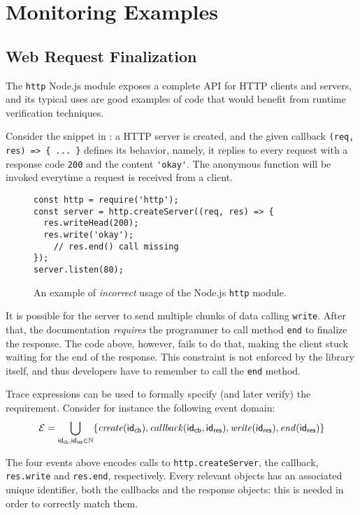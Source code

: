 \section{Monitoring Examples}
\label{sec:examples}
\subsection{Web Request Finalization}
The \lstinline{http} Node.js module exposes a complete API for HTTP clients and servers, and its typical uses are good examples of code that would benefit from runtime verification techniques.

Consider the snippet in : a HTTP server is created, and the given callback \lstinline|(req, res) => { ... }| defines its behavior, namely, it replies to every request with a response code \lstinline{200} and the content \lstinline{'okay'}.
The anonymous function will be invoked everytime a request is received from a client.

\begin{figure}[h]
\begin{lstlisting}
const http = require('http');
const server = http.createServer((req, res) => {
  res.writeHead(200);
  res.write('okay');
	// res.end() call missing
});
server.listen(80);
\end{lstlisting}
\caption{An example of \emph{incorrect} usage of the Node.js \lstinline{http} module.}
\label{lst:end}
\end{figure}

It is possible for the server to send multiple chunks of data calling \lstinline{write}.
After that, the documentation \emph{requires} the programmer to call method \lstinline{end} to finalize the response.
The code above, however, fails to do that, making the client stuck waiting for the end of the response.
This constraint is not enforced by the library itself, and thus developers have to remember to call the \lstinline{end} method.

Trace expressions can be used to formally specify (and later verify) the requirement.
Consider for instance the following event domain:
\[ \mathcal{E} = \bigcup_{\mathsf{id_{cb}},\mathsf{id_{res}} \in \mathbb{N}} \{\mathit{create}(\mathsf{id_{cb}}), \mathit{callback}(\mathsf{id_{cb}}, \mathsf{id_{res}}), \mathit{write}(\mathsf{id_{res}}), \mathit{end}(\mathsf{id_{res}}) \} \]

The four events above encodes calls to \lstinline{http.createServer}, the callback, \lstinline{res.write} and \lstinline{res.end}, respectively.
Every relevant objects has an associated unique identifier, both the callbacks and the response objects: this is needed in order to correctly match them.

